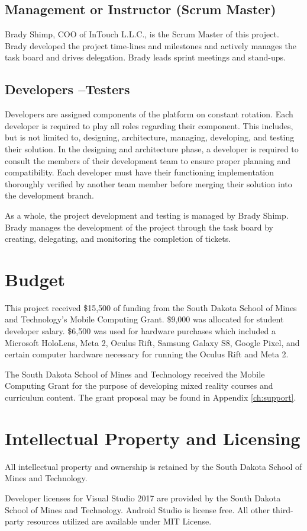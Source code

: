\subsection{Management or Instructor (Scrum Master)} 

Brady Shimp, COO of InTouch L.L.C., is the Scrum Master of this project. Brady developed the project time-lines and milestones and actively manages the task board and drives delegation. Brady leads sprint meetings and stand-ups. 

\subsection{Developers --Testers}

Developers are assigned components of the platform on constant rotation. Each developer is required to play all roles regarding their component. This includes, but is not limited to, designing, architecture, managing, developing, and testing their solution. In the designing and architecture phase, a developer is required to consult the members of their development team to ensure proper planning and compatibility. Each developer must have their functioning implementation thoroughly verified by another team member before merging their solution into the development branch. 

As a whole, the project development and testing is managed by Brady Shimp. Brady manages the development of the project through the task board by creating, delegating, and monitoring the completion of tickets. 

\section{Budget}

This project received \$15,500 of funding from the South Dakota School of Mines and Technology's Mobile Computing Grant. \$9,000 was allocated for student developer salary. \$6,500 was used for hardware purchases which included a Microsoft HoloLens, Meta 2, Oculus Rift, Samsung Galaxy S8, Google Pixel, and certain computer hardware necessary for running the Oculus Rift and Meta 2. 
 
The South Dakota School of Mines and Technology received the Mobile Computing Grant for the purpose of developing mixed reality courses and curriculum content. The grant proposal may be found in Appendix \ref{ch:support}.

\section{Intellectual Property and Licensing}

All intellectual property and ownership is retained by the South Dakota School of Mines and Technology.

Developer licenses for Visual Studio 2017 are provided by the South Dakota School of Mines and Technology. Android Studio is license free. All other third-party resources utilized are available under MIT License. 
